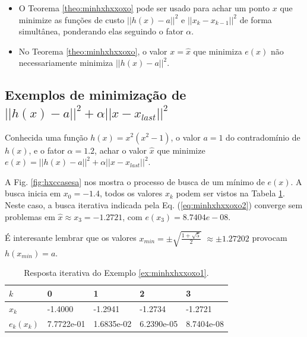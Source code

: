 \begin{tcbattention}
\begin{itemize}
\item O Teorema \ref{theo:minhxhxxoxo} pode ser usado para achar um ponto $x$
que minimize as funções de custo $||h(x)-a||^2$ e
 $||x_{k}-x_{k-1}||^2$ de forma simultânea, ponderando elas seguindo o fator $\alpha$.
\item No Teorema \ref{theo:minhxhxxoxo}, o valor $x=\hat{x}$ 
que minimiza $e(x)$ não necessariamente minimiza $||h(x)-a||^2$.
\end{itemize}
\end{tcbattention}
\subsection{Exemplos de minimização de $||h(x)-a||^2+\alpha ||x-x_{last}||^2$}


\begin{example}\label{ex:minhxhxxoxo1}
Conhecida uma função $h(x)=x^2(x^2-1)$, o valor $a=1$ do contradomínio de $h(x)$,
e o fator $\alpha=1.2$,
achar o valor $\hat{x}$ que minimize $e(x)=||h(x)-a||^2+\alpha||x-x_{last}||^2$.
\end{example}
\begin{SolutionT}\label{sol:minhxhxxoxo1}
 A Fig. \ref{fig:hxccasesa} nos mostra o processo de busca de um mínimo
 de $e(x)$. A busca inicia em $x_0=-1.4$,
 todos os valores $x_{k}$ podem ser vistos na Tabela \ref{tab:hxccases1}. 
Neste caso, a busca iterativa indicada pela Eq. (\ref{eq:minhxhxxoxo2}) converge sem problemas 
em $\hat{x}\approx x_3 =-1.2721$, com $e(x_3)=8.7404e-08$.

É interesante lembrar que os valores $x_{min}=\pm \sqrt{\frac{1+\sqrt{5}}{2}}$ 
$\approx \pm 1.27202$ provocam $h(x_{min})=a$.
\end{SolutionT}

\begin{table}[!h]
\centering
\begin{tabular}{|l|l|l|l|l|}
\hline
$k$      & 0 & 1 & 2 & 3 \\ \hline
$x_k$    & -1.4000 & -1.2941 & -1.2734 & -1.2721 \\ \hline
$e_k(x_k)$ & 7.7722e-01 & 1.6835e-02 & 6.2390e-05 & 8.7404e-08 \\ \hline
\end{tabular}
\caption{Resposta iterativa do Exemplo \ref{ex:minhxhxxoxo1}.}
\label{tab:hxccases1}
\end{table}


